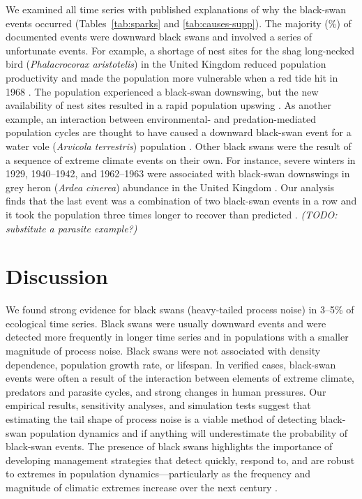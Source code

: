 We examined all time series with published explanations of why the black-swan
events occurred (Tables~\ref{tab:sparks} and \ref{tab:causes-supp}). The
majority (\percBSDown \%) of documented events were downward black swans and
involved a series of unfortunate events. For example, a shortage of nest sites
for the shag long-necked bird (\textit{Phalacrocorax aristotelis}) in the
United Kingdom reduced population productivity and made the population more
vulnerable when a red tide hit in 1968 \citep{potts1980}. The population
experienced a black-swan downswing, but the new availability of nest sites
resulted in a rapid population upswing \citep{potts1980}. As another example,
an interaction between environmental- and predation-mediated population cycles
are thought to have caused a downward black-swan event for a water vole
(\textit{Arvicola terrestris}) population \citep{saucy1994}. Other black swans
were the result of a sequence of extreme climate events on their own. For
instance, severe winters in 1929, 1940--1942, and 1962--1963 were associated
with black-swan downswings in grey heron (\textit{Ardea cinerea}) abundance in
the United Kingdom \citep{stafford1971}. Our analysis finds that the last event
was a combination of two black-swan events in a row and it took the population
three times longer to recover than predicted \citep{stafford1971}.
\textit{(TODO: substitute a parasite example?)}

\section{Discussion}

We found strong evidence for black swans (heavy-tailed process noise) in 3--5\%
of ecological time series. Black swans were usually downward events and were
detected more frequently in longer time series and in populations with a
smaller magnitude of process noise. Black swans were not associated with
density dependence, population growth rate, or lifespan. In verified cases,
black-swan events were often a result of the interaction between elements of
extreme climate, predators and parasite cycles, and strong changes in human
pressures. Our empirical results, sensitivity analyses, and simulation tests
suggest that estimating the tail shape of process noise is a viable method of
detecting black-swan population dynamics and if anything will underestimate the
probability of black-swan events. The presence of black swans highlights the
importance of developing management strategies that detect quickly, respond to,
and are robust to extremes in population dynamics---particularly as the
frequency and magnitude of climatic extremes increase over the next century
\citep{easterling2000,ipcc2012}.

